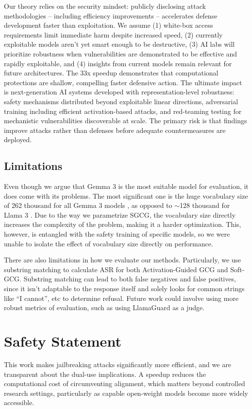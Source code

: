 \documentclass[letterpaper]{article} %
\begin{document}
Our theory relies on the security mindset: publicly disclosing attack methodologies -- including efficiency improvements -- accelerates defense development faster than exploitation. We assume (1) white-box access requirements limit immediate harm despite increased speed, (2) currently exploitable models aren't yet smart enough to be destructive, (3) AI labs will prioritize robustness when vulnerabilities are demonstrated to be effective and rapidly exploitable, and (4) insights from current models remain relevant for future architectures. The 33x speedup demonstrates that computational protections are shallow, compelling faster defensive action. The ultimate impact is next-generation AI systems developed with representation-level robustness: safety mechanisms distributed beyond exploitable linear directions, adversarial training including efficient activation-based attacks, and red-teaming testing for mechanistic vulnerabilities discoverable at scale. The primary risk is that findings improve attacks rather than defenses before adequate countermeasures are deployed.

\subsection{Limitations}

Even though we argue that Gemma 3 is the most suitable model for evaluation, it does come with its problems. The most significant one is the huge vocabulary size of 262 thousand for all Gemma 3 models \citep{Google_Gemma3_2025}, as opposed to $\sim$128 thousand for Llama 3 \citep{HuggingFace_Llama3_2024}. Due to the way we parametrize SGCG, the vocabulary size directly increases the complexity of the problem, making it a harder optimization. This, however, is entangled with the safety training of specific models, so we were unable to isolate the effect of vocabulary size directly on performance.  

There are also limitations in how we evaluate our methods. Particularly, we use substring matching to calculate ASR for both Activation-Guided GCG and Soft-GCG. Substring matching can lead to both false negatives and false positives, since it isn't adaptable to the response itself and solely looks for common strings like ``I cannot'', etc to determine refusal. Future work could involve using more robust metrics of evaluation, such as using LlamaGuard as a judge.

\section{Safety Statement}
This work makes jailbreaking attacks significantly more efficient, and we are transparent about the dual-use implications. A speedup reduces the computational cost of circumventing alignment, which matters beyond controlled research settings, particularly as capable open-weight models become more widely accessible.
\end{document}
